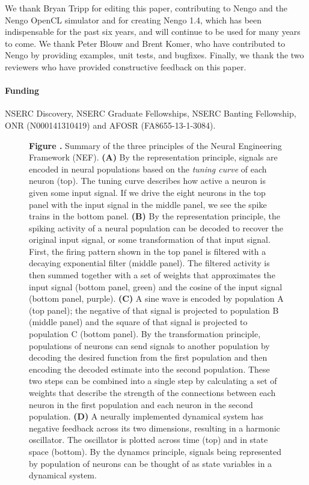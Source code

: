 \documentclass{frontiersSCNS}
\begin{document}
We thank Bryan Tripp
for editing this paper,
contributing to Nengo
and the Nengo OpenCL simulator
and for creating Nengo 1.4,
which has been indispensable
for the past six years,
and will continue
to be used for many years to come.
We thank Peter Blouw and Brent Komer,
who have contributed
to Nengo by providing examples,
unit tests, and bugfixes.
Finally, we thank the two reviewers
who have provided constructive
feedback on this paper.

\paragraph{Funding\textcolon}
NSERC Discovery, NSERC Graduate Fellowships,
NSERC Banting Fellowship, ONR (N000141310419)
and AFOSR (FA8655-13-1-3084).




\clearpage

\begin{figure}
 \textbf{\label{fig:nef} Figure .}{
   Summary of the three principles of the Neural Engineering Framework
   (NEF). \textbf{(A)} By the representation principle, signals are encoded
   in neural populations based on the \textit{tuning curve}
   of each neuron (top). The tuning curve describes
   how active a neuron is given some input signal.
   If we drive the eight neurons in the top panel
   with the input signal in the middle panel,
   we see the spike trains in the bottom panel.
   \textbf{(B)} By the representation principle,
   the spiking activity of a neural population
   can be decoded to recover the original input signal,
   or some transformation of that input signal.
   First, the firing pattern shown in the top panel
   is filtered with a decaying exponential filter (middle panel).
   The filtered activity is then summed together
   with a set of weights that approximates
   the input signal (bottom panel, green)
   and the cosine of the input signal (bottom panel, purple).
   \textbf{(C)} A sine wave is encoded by population A (top panel);
   the negative of that signal is projected
   to population B (middle panel)
   and the square of that signal is projected
   to population C (bottom panel).
   By the transformation principle,
   populations of neurons can send signals
   to another population by decoding
   the desired function from the first population
   and then encoding the decoded estimate
   into the second population.
   These two steps can be combined into a single step
   by calculating a set of weights
   that describe the strength of the connections
   between each neuron in the first population
   and each neuron in the second population.
   \textbf{(D)} A neurally implemented dynamical system
   has negative feedback across its two dimensions,
   resulting in a harmonic oscillator.
   The oscillator is plotted across time (top)
   and in state space (bottom).
   By the dynamcs principle,
   signals being represented by population of neurons
   can be thought of as state variables in a dynamical system.}
\end{figure}
\end{document}
